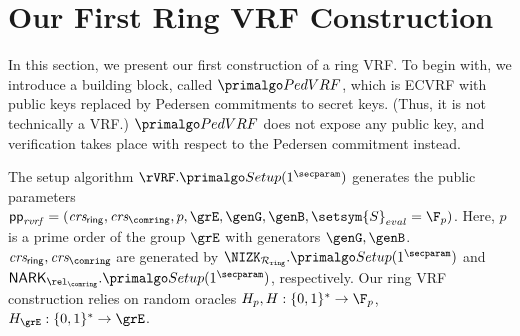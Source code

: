 
\def\tmpaux{\aux \doubleplus \piring \doubleplus \comring}
\def\tmpeprintaux{\eprint{\aux'}{\tmpaux}}
\def\tmpindent{\hspace*{5pt}}
\section{Our First Ring VRF Construction}%
\label{sec:pedersen_vrf}

In this section, we present our first construction of a ring VRF.  To begin with, we introduce a building block, called $\PedVRF$, which is ECVRF with public keys replaced by Pedersen commitments to secret keys. 
(Thus, it is not technically a VRF.)  $\PedVRF$ does not expose any public key, and verification takes place with respect to the Pedersen commitment instead.

The setup algorithm $ \rVRF.\Setup(1^\secparam) $ generates the public parameters $ \pprvrf = (\crsrvrf,\crsnark, p,\grE, \genG,\genB, \setsym{S}_{eval}  = \F_p)$. Here, $ p $ is a prime order of the group $ \grE $ with generators $ \genG,\genB $.  $ \crsrvrf, \crsnark $ are generated by $ \NIZK_{\Rring}.\Setup(1^\secparam) $ and $ \NARK_{\relcomring}.\Setup(1^\secparam) $, respectively. Our ring VRF construction relies on random oracles $H_p,H: \{0,1\}^* \to \F_p$, $H_{\grE}: \{0,1\}^* \to \grE$.




